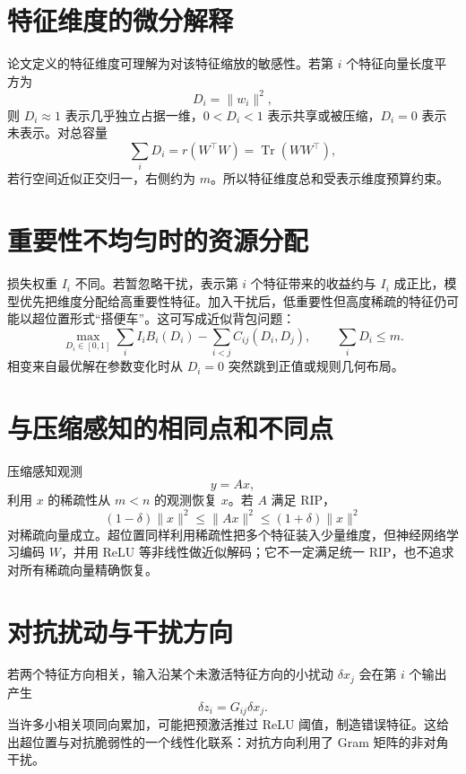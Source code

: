 \documentclass[UTF8,12pt,a4paper,fontset=none]{ctexart}
\numberwithin{equation}{section}
\newcommand{\tr}{\operatorname{Tr}}
\begin{document}
\section{特征维度的微分解释}
论文定义的特征维度可理解为对该特征缩放的敏感性。若第 $i$ 个特征向量长度平方为
\begin{equation}
 D_i=\|w_i\|^2,
\end{equation}
则 $D_i\approx1$ 表示几乎独立占据一维，$0<D_i<1$ 表示共享或被压缩，$D_i=0$ 表示未表示。对总容量
\begin{equation}
 \sum_iD_i=	r(W^\top W)=\tr(WW^\top),
\end{equation}
若行空间近似正交归一，右侧约为 $m$。所以特征维度总和受表示维度预算约束。

\section{重要性不均匀时的资源分配}
损失权重 $I_i$ 不同。若暂忽略干扰，表示第 $i$ 个特征带来的收益约与 $I_i$ 成正比，模型优先把维度分配给高重要性特征。加入干扰后，低重要性但高度稀疏的特征仍可能以超位置形式“搭便车”。这可写成近似背包问题：
\begin{equation}
 \max_{D_i\in[0,1]}
 \sum_i I_iB_i(D_i)-
 \sum_{i<j}C_{ij}(D_i,D_j),
 \qquad
 \sum_iD_i\le m.
\end{equation}
相变来自最优解在参数变化时从 $D_i=0$ 突然跳到正值或规则几何布局。

\section{与压缩感知的相同点和不同点}
压缩感知观测
\begin{equation}
 y=Ax,
\end{equation}
利用 $x$ 的稀疏性从 $m<n$ 的观测恢复 $x$。若 $A$ 满足 RIP，
\begin{equation}
 (1-\delta)\|x\|^2\le\|Ax\|^2\le(1+\delta)\|x\|^2
\end{equation}
对稀疏向量成立。超位置同样利用稀疏性把多个特征装入少量维度，但神经网络学习编码 $W$，并用 ReLU 等非线性做近似解码；它不一定满足统一 RIP，也不追求对所有稀疏向量精确恢复。

\section{对抗扰动与干扰方向}
若两个特征方向相关，输入沿某个未激活特征方向的小扰动 $\delta x_j$ 会在第 $i$ 个输出产生
\begin{equation}
 \delta z_i=G_{ij}\delta x_j.
\end{equation}
当许多小相关项同向累加，可能把预激活推过 ReLU 阈值，制造错误特征。这给出超位置与对抗脆弱性的一个线性化联系：对抗方向利用了 Gram 矩阵的非对角干扰。
\end{document}
